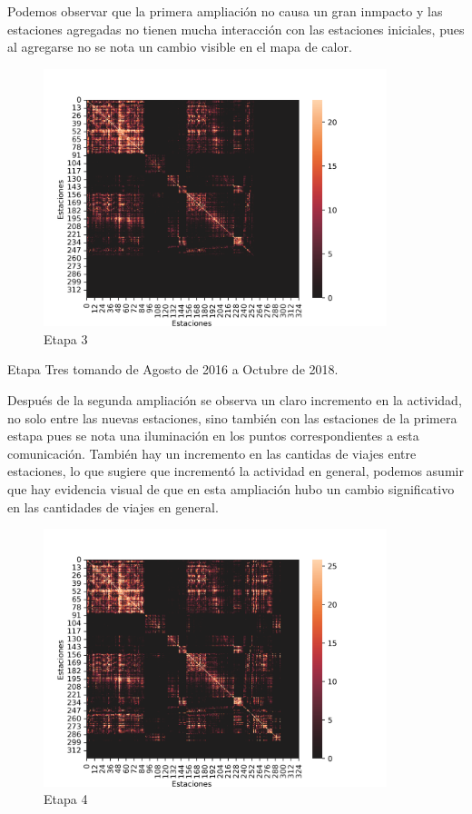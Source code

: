 \documentclass[
]{article}
\begin{document}
Podemos observar que la primera ampliación no causa un gran inmpacto y
las estaciones agregadas no tienen mucha interacción con las estaciones
iniciales, pues al agregarse no se nota un cambio visible en el mapa de
calor.

\newpage
\begin{figure}[h]
\centering
\includegraphics[width=10cm]{../plots/resultsTres.png}
\caption{Etapa 3}
\end{figure}

Etapa Tres tomando de Agosto de 2016 a Octubre de 2018.

Después de la segunda ampliación se observa un claro incremento en la
actividad, no solo entre las nuevas estaciones, sino también con las
estaciones de la primera estapa pues se nota una iluminación en los
puntos correspondientes a esta comunicación. También hay un incremento
en las cantidas de viajes entre estaciones, lo que sugiere que
incrementó la actividad en general, podemos asumir que hay evidencia
visual de que en esta ampliación hubo un cambio significativo en las
cantidades de viajes en general.

\newpage
\begin{figure}[h]
\centering
\includegraphics[width=10cm]{../plots/resultsCuatro.png}
\caption{Etapa 4}
\end{figure}
\end{document}

